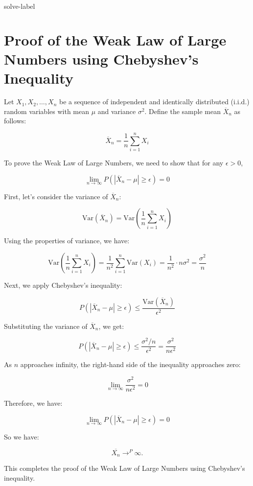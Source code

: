 	\begin{solve}{}{solve-label}
\section*{Proof of the Weak Law of Large Numbers using Chebyshev's Inequality}

Let $X_1, X_2, \ldots, X_n$ be a sequence of independent and identically distributed (i.i.d.) random variables with mean $\mu$ and variance $\sigma^2$. Define the sample mean $\overline{X}_n$ as follows:



\[
\overline{X}_n = \frac{1}{n} \sum_{i=1}^{n} X_i
\]



To prove the Weak Law of Large Numbers, we need to show that for any $\epsilon > 0$,



\[
\lim_{n \to \infty} P\left( \left| \overline{X}_n - \mu \right| \geq \epsilon \right) = 0
\]



First, let's consider the variance of $\overline{X}_n$:



\[
\text{Var}(\overline{X}_n) = \text{Var}\left( \frac{1}{n} \sum_{i=1}^{n} X_i \right)
\]



Using the properties of variance, we have:



\[
\text{Var}\left( \frac{1}{n} \sum_{i=1}^{n} X_i \right) = \frac{1}{n^2} \sum_{i=1}^{n} \text{Var}(X_i) = \frac{1}{n^2} \cdot n \sigma^2 = \frac{\sigma^2}{n}
\]



Next, we apply Chebyshev's inequality:



\[
P\left( \left| \overline{X}_n - \mu \right| \geq \epsilon \right) \leq \frac{\text{Var}(\overline{X}_n)}{\epsilon^2}
\]



Substituting the variance of $\overline{X}_n$, we get:



\[
P\left( \left| \overline{X}_n - \mu \right| \geq \epsilon \right) \leq \frac{\sigma^2/n}{\epsilon^2} = \frac{\sigma^2}{n \epsilon^2}
\]



As $n$ approaches infinity, the right-hand side of the inequality approaches zero:



\[
\lim_{n \to \infty} \frac{\sigma^2}{n \epsilon^2} = 0
\]



Therefore, we have:



\[
\lim_{n \to \infty} P\left( \left| \overline{X}_n - \mu \right| \geq \epsilon \right) = 0
\]

So we have: 

$$\overline{X_n} \to^P \infty.$$

This completes the proof of the Weak Law of Large Numbers using Chebyshev's inequality. \\\cite{r1,r2,r3,r4,r5,r6,r7}
	\end{solve}
	
	
	
	
	
